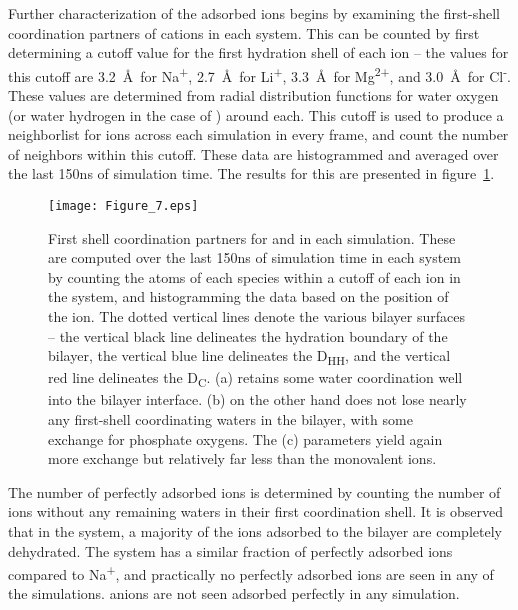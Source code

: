 Further characterization of the adsorbed ions begins by examining the first-shell coordination partners of cations in each system.
This can be counted by first determining a cutoff value for the first hydration shell of each ion 
-- the values for this cutoff are
3.2~\AA~for Na\textsuperscript{+}, 2.7~\AA~for Li\textsuperscript{+}, 3.3~\AA~for Mg\textsuperscript{2+}, 
and 3.0~\AA~for Cl\textsuperscript{-}. 
These values are determined from radial distribution 
functions for water oxygen (or water hydrogen in the case of \cl) around each. 
This cutoff is used to produce a neighborlist for ions
across each simulation in every frame, and count the number of neighbors within this cutoff. 
These data {are} histogrammed and averaged over
the last 150ns of simulation time. The results for this are presented in figure~\ref{figch3:cood}.
\begin{figure}[h!tb]
    \caption[First shell coordinators for \li{} and \mg]{First shell coordination partners 
        for \li{} and \mg in each simulation. 
        These are computed over the last 150ns of 
        simulation time in each system by counting 
        the atoms of each species within a cutoff 
        of each ion in the system, and histogramming 
        the data based on the position of the ion. 
        The dotted vertical lines denote the various 
        bilayer surfaces -- the vertical black
        line delineates the hydration boundary of the bilayer,
        the vertical blue line delineates the D\textsubscript{HH},
        and the vertical red line delineates the D\textsubscript{C}.
        \li{} (a) retains some water 
        coordination well into the bilayer
        interface.
        \mgmbnbfix (b) on the other hand does not lose
        nearly any first-shell coordinating
        waters in the bilayer, with some exchange for phosphate
        oxygens. The \mgmicro (c) parameters yield again more exchange but 
        relatively far less than the monovalent
    ions.}
    \label{figch3:cood}
    \texttt{[image: Figure\_7.eps]}
\end{figure}

The number of perfectly adsorbed ions is determined by counting the number of ions without any remaining 
waters in their first coordination shell. It is observed that in the \na system, a 
majority of the ions adsorbed to the bilayer are completely dehydrated. %
The \li{} system has a similar fraction of perfectly adsorbed ions compared to Na\textsuperscript{+}, 
and practically no perfectly adsorbed 
ions are seen in any of the \mg simulations. \cl anions are not seen adsorbed perfectly in any simulation.


